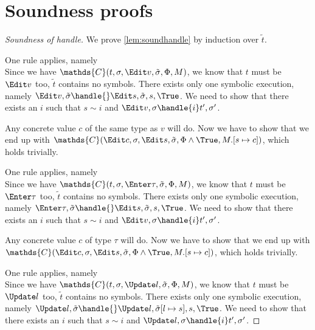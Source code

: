 
\section{Soundness proofs}
\label{sec:soundnessproofs}

\begin{proof}[Soundness of handle]

  We prove \cref{lem:soundhandle} by induction over $\tilde{t}$.

  {One rule applies, namely \\
  Since we have $\mathds{C}(t,\sigma,\Edit v,\tilde{\sigma},\Phi,M)$, we know that $t$ must be $\Edit v$ too, $\tilde{t}$ contains no symbols.
  There exists only one symbolic execution, namely $\Edit v,\tilde{\sigma}\handle{}\Edit s,\tilde{\sigma},s,\True$.
  We need to show that there exists an $i$ such that $s\sim i$ and $\Edit v,\sigma\handle{i}t',\sigma'$.

  Any concrete value $c$ of the same type as $v$ will do. Now we have to show that we end up with $\mathds{C}(\Edit c,\sigma,\Edit s,\tilde{\sigma},\Phi\land\True,M.[s\mapsto c])$, which holds trivially.
  }

{One rule applies, namely \\
Since we have $\mathds{C}(t,\sigma,\Enter \tau,\tilde{\sigma},\Phi,M)$, we know that $t$ must be $\Enter \tau$ too, $\tilde{t}$ contains no symbols.
There exists only one symbolic execution, namely $\Enter \tau,\tilde{\sigma}\handle{}\Edit s,\tilde{\sigma},s,\True$.
We need to show that there exists an $i$ such that $s\sim i$ and $\Edit v,\sigma\handle{i}t',\sigma'$.

Any concrete value $c$ of type $\tau$ will do. Now we have to show that we end up with $\mathds{C}(\Edit c,\sigma,\Edit s,\tilde{\sigma},\Phi\land\True,M.[s\mapsto c])$, which holds trivially.
}

{One rule applies, namely \\

Since we have $\mathds{C}(t,\sigma,\Update l,\tilde{\sigma},\Phi,M)$, we know that $t$ must be $\Update l$ too, $\tilde{t}$ contains no symbols.
There exists only one symbolic execution, namely $\Update l,\tilde{\sigma}\handle{}\Update l,\tilde{\sigma}[l\mapsto s],s,\True$.
We need to show that there exists an $i$ such that $s\sim i$ and $\Update l,\sigma\handle{i}t',\sigma'$.

}
\end{proof}
